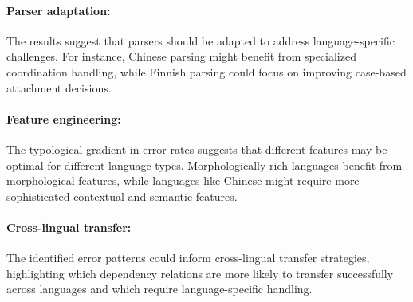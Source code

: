 \documentclass[11pt]{article}
\begin{document}
\paragraph{Parser adaptation:} The results suggest that parsers should be adapted to address language-specific challenges. For instance, Chinese parsing might benefit from specialized coordination handling, while Finnish parsing could focus on improving case-based attachment decisions.

\paragraph{Feature engineering:} The typological gradient in error rates suggests that different features may be optimal for different language types. Morphologically rich languages benefit from morphological features, while languages like Chinese might require more sophisticated contextual and semantic features.

\paragraph{Cross-lingual transfer:} The identified error patterns could inform cross-lingual transfer strategies, highlighting which dependency relations are more likely to transfer successfully across languages and which require language-specific handling.
\end{document}
